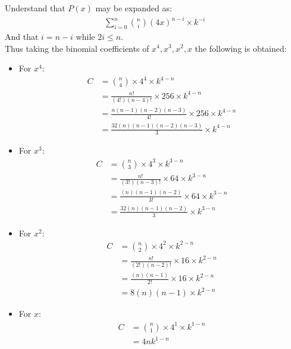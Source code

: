 \documentclass[12pt]{article}
\begin{document}
Understand that $P(x)$ may be expanded as:
\begin{align*}
	\displaystyle\sum_{i=0}^{n}{\binom{n}{i} (4x)^{n-i} \times k^{-i}}
\end{align*}
And that $i = n - i$ while $2i \leq n$. \\
Thus taking the binomial coefficients of $x^4, x^3, x^2, x$ the following is obtained:
\begin{itemize}
	\item For $x^4$:
	      \begin{equation}
		      \begin{split}
			      C & = \binom{n}{4} \times 4^4 \times k^{4-n}                \\
			        & = \frac{n!}{(4!)(n-4)!} \times 256 \times k^{4-n}       \\
			        & = \frac{n(n-1)(n-2)(n-3)}{4!} \times 256 \times k^{4-n} \\
			        & = \frac{32(n)(n-1)(n-2)(n-3)}{3} \times k^{4-n}
		      \end{split}
		      \label{eq:No.1}
	      \end{equation}

	\item For $x^3$:
	      \begin{equation}
		      \begin{split}
			      C & = \binom{n}{3} \times 4^3 \times k^{3-n}            \\
			        & = \frac{n!}{(3!)(n-3)!} \times 64 \times k^{3-n}    \\
			        & = \frac{(n)(n-1)(n-2)}{3!} \times 64 \times k^{3-n} \\
			        & = \frac{32(n)(n-1)(n-2)}{3} \times k^{3-n}
		      \end{split}
		      \label{eq:No.2}
	      \end{equation}

	\item For $x^2$:
	      \begin{equation}
		      \begin{split}
			      C & = \binom{n}{2} \times 4^2 \times k^{2-n}         \\
			        & = \frac{n!}{(2!)(n-2)!} \times 16 \times k^{2-n} \\
			        & = \frac{(n)(n-1)}{2!} \times 16 \times k^{2-n}   \\
			        & = 8(n)(n-1) \times k^{2-n}
		      \end{split}
		      \label{eq:No.3}
	      \end{equation}

	\item For $x$:
	      \begin{equation}
		      \begin{split}
			      C & = \binom{n}{1} \times 4^1 \times k^{1-n} \\
			        & =  4nk^{1-n}
		      \end{split}
		      \label{eq:No.4}
	      \end{equation}
\end{itemize}
\end{document}
